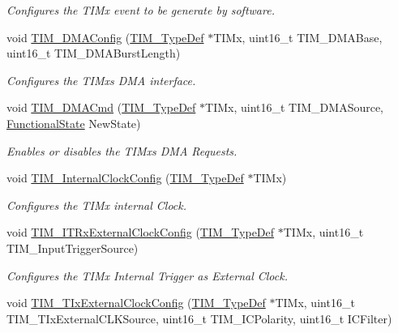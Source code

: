 \begin{DoxyCompactItemize}
\begin{DoxyCompactList}\small\item\em Configures the T\+I\+Mx event to be generate by software. \end{DoxyCompactList}\item 
void \mbox{\hyperlink{group___t_i_m___private___functions_gad7156f84c436c8ac92cd789611826d09}{T\+I\+M\+\_\+\+D\+M\+A\+Config}} (\mbox{\hyperlink{struct_t_i_m___type_def}{T\+I\+M\+\_\+\+Type\+Def}} $\ast$T\+I\+Mx, uint16\+\_\+t T\+I\+M\+\_\+\+D\+M\+A\+Base, uint16\+\_\+t T\+I\+M\+\_\+\+D\+M\+A\+Burst\+Length)
\begin{DoxyCompactList}\small\item\em Configures the T\+I\+Mx\textquotesingle{}s D\+MA interface. \end{DoxyCompactList}\item 
void \mbox{\hyperlink{group___t_i_m___private___functions_ga24700389cfa3ea9b42234933b23f1399}{T\+I\+M\+\_\+\+D\+M\+A\+Cmd}} (\mbox{\hyperlink{struct_t_i_m___type_def}{T\+I\+M\+\_\+\+Type\+Def}} $\ast$T\+I\+Mx, uint16\+\_\+t T\+I\+M\+\_\+\+D\+M\+A\+Source, \mbox{\hyperlink{group___exported__types_gac9a7e9a35d2513ec15c3b537aaa4fba1}{Functional\+State}} New\+State)
\begin{DoxyCompactList}\small\item\em Enables or disables the T\+I\+Mx\textquotesingle{}s D\+MA Requests. \end{DoxyCompactList}\item 
void \mbox{\hyperlink{group___t_i_m___private___functions_ga2394f0221709c0659874f9a4184cf86e}{T\+I\+M\+\_\+\+Internal\+Clock\+Config}} (\mbox{\hyperlink{struct_t_i_m___type_def}{T\+I\+M\+\_\+\+Type\+Def}} $\ast$T\+I\+Mx)
\begin{DoxyCompactList}\small\item\em Configures the T\+I\+Mx internal Clock. \end{DoxyCompactList}\item 
void \mbox{\hyperlink{group___t_i_m___private___functions_gabef227d21d9e121e6a4ec5ab6223f5a9}{T\+I\+M\+\_\+\+I\+T\+Rx\+External\+Clock\+Config}} (\mbox{\hyperlink{struct_t_i_m___type_def}{T\+I\+M\+\_\+\+Type\+Def}} $\ast$T\+I\+Mx, uint16\+\_\+t T\+I\+M\+\_\+\+Input\+Trigger\+Source)
\begin{DoxyCompactList}\small\item\em Configures the T\+I\+Mx Internal Trigger as External Clock. \end{DoxyCompactList}\item 
void \mbox{\hyperlink{group___t_i_m___private___functions_gaf460e7d9c9969044e364130e209937fc}{T\+I\+M\+\_\+\+T\+Ix\+External\+Clock\+Config}} (\mbox{\hyperlink{struct_t_i_m___type_def}{T\+I\+M\+\_\+\+Type\+Def}} $\ast$T\+I\+Mx, uint16\+\_\+t T\+I\+M\+\_\+\+T\+Ix\+External\+C\+L\+K\+Source, uint16\+\_\+t T\+I\+M\+\_\+\+I\+C\+Polarity, uint16\+\_\+t I\+C\+Filter)

\end{DoxyCompactItemize}
